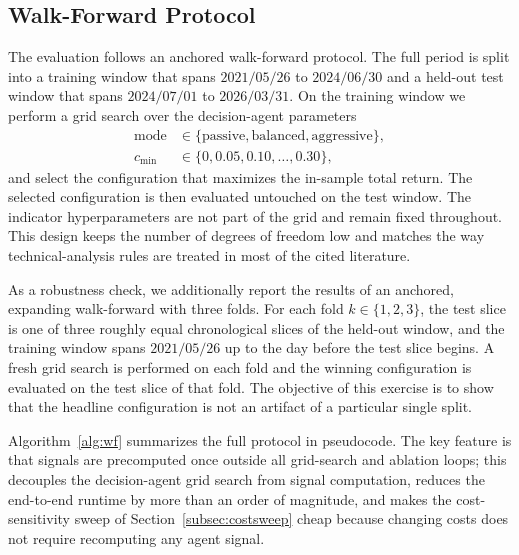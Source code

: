\documentclass{ieeeaccess}
\begin{document}
\subsection{Walk-Forward Protocol}
\label{subsec:walkforward}

The evaluation follows an anchored walk-forward protocol. The full period is split into a training window that spans $2021/05/26$ to $2024/06/30$ and a held-out test window that spans $2024/07/01$ to $2026/03/31$. On the training window we perform a grid search over the decision-agent parameters
\begin{equation}
\begin{aligned}
\mathrm{mode} &\in \{\text{passive}, \text{balanced}, \text{aggressive}\}, \\
c_{\min} &\in \{0, 0.05, 0.10, \ldots, 0.30\},
\end{aligned}
\end{equation}
and select the configuration that maximizes the in-sample total return. The selected configuration is then evaluated untouched on the test window. The indicator hyperparameters are not part of the grid and remain fixed throughout. This design keeps the number of degrees of freedom low and matches the way technical-analysis rules are treated in most of the cited literature.

As a robustness check, we additionally report the results of an anchored, expanding walk-forward with three folds. For each fold $k \in \{1, 2, 3\}$, the test slice is one of three roughly equal chronological slices of the held-out window, and the training window spans $2021/05/26$ up to the day before the test slice begins. A fresh grid search is performed on each fold and the winning configuration is evaluated on the test slice of that fold. The objective of this exercise is to show that the headline configuration is not an artifact of a particular single split.

Algorithm~\ref{alg:wf} summarizes the full protocol in pseudocode. The key feature is that signals are precomputed once outside all grid-search and ablation loops; this decouples the decision-agent grid search from signal computation, reduces the end-to-end runtime by more than an order of magnitude, and makes the cost-sensitivity sweep of Section~\ref{subsec:costsweep} cheap because changing costs does not require recomputing any agent signal.
\end{document}
